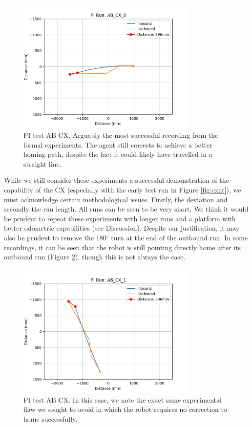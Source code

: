 \documentclass[a4paper,11pt,twoside,openright]{article}
\begin{document}
\begin{figure}[h!]
  \centering
  \includegraphics[width=0.8\textwidth]{AB_CX_8}
  \caption{\label{fig:abcx8i} PI test AB\textunderscore
    CX. Arguably the most successful recording from
    the formal experiments. The agent still corrects to achieve a
    better homing path, despite the fact it could likely have
    travelled in a straight line. }
\end{figure}

While we still consider these experiments a successful demonstration
of the capability of the CX (especially with the early test run in
Figure \ref{fig:cxnt}), we must acknowledge certain methodological
issues. Firstly, the deviation and secondly the run length. All runs
can be seen to be very short. We think it would be prudent to repeat
these experiments with longer runs and a platform with better
odometric capabilities (see Discussion). Despite our justification, it
may also be prudent to remove the 180$^{\circ}$ turn at the end of the
outbound run. In some recordings, it can be seen that the robot is
still pointing directly home after its outbound run (Figure
\ref{fig:abcx1i}), though this is not always the case.

\begin{figure}[h!]
  \centering
  \includegraphics[width=0.8\textwidth]{AB_CX_1}
  \caption{\label{fig:abcx1i} PI test AB\textunderscore
    CX. In this case, we note the exact same
    experimental flaw we sought to avoid in which the robot requires
    no correction to home successfully.}
\end{figure}
\end{document}
